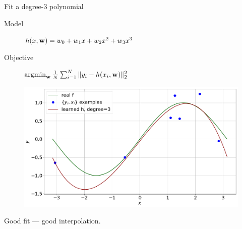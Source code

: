 \documentclass[lualatex, aspectratio=169]{beamer}
\begin{document}






\begin{frame}{Fit a degree-3 polynomial}

  \begin{description}
    \item[Model] $h(x, \mathbf{w}) = w_0 + w_1 x + w_2 x^2 + w_3 x^3$
    \item[Objective] $\argmin_{\v{w}} \frac{1}{N} \sum^N_{i=1} \|y_i - h(x_i, \v{w})\|^2_2$ 
  \end{description}

  \begin{figure}
    \includegraphics[width=0.5\pagewidth]{assets/poly3.png}
  \end{figure}

  Good fit --- good interpolation.

\end{frame}
\end{document}
